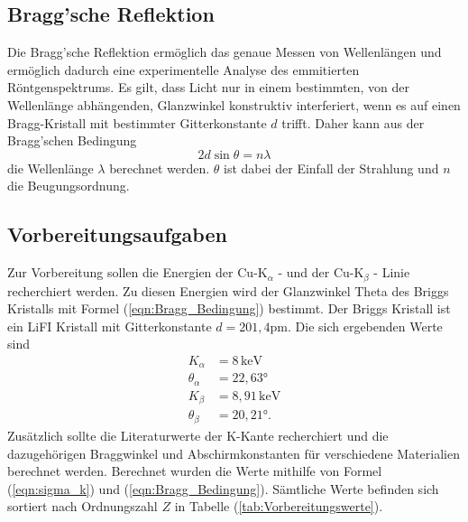 \subsection{Bragg'sche Reflektion}
Die Bragg'sche Reflektion ermöglich das genaue Messen von Wellenlängen und ermöglich dadurch eine experimentelle Analyse des emmitierten Röntgenspektrums. Es gilt, 
dass Licht nur in einem bestimmten, von der Wellenlänge abhängenden, Glanzwinkel konstruktiv interferiert, wenn es auf einen Bragg-Kristall mit bestimmter Gitterkonstante
$d$ trifft. Daher kann aus der Bragg'schen Bedingung 
\begin{equation}
    \label{eqn:Bragg_Bedingung}
    2 d \sin{\theta} = n \lambda
\end{equation}
die Wellenlänge $\lambda$ berechnet werden. $\theta$ ist dabei der Einfall der Strahlung und $n$ die Beugungsordnung.

\subsection{Vorbereitungsaufgaben}
\label{sec:Vorbereitungsaufgaben}
Zur Vorbereitung sollen die Energien der $\text{Cu-K}_\alpha$ - und der $\text{Cu-K}_{\beta}$ - Linie recherchiert werden. Zu diesen Energien wird der Glanzwinkel 
Theta des Briggs Kristalls mit Formel (\ref{eqn:Bragg_Bedingung}) bestimmt. Der Briggs Kristall ist ein LiFI Kristall mit Gitterkonstante $d = 201,4 \unit{\pico\meter}$.
Die sich ergebenden Werte sind 
\begin{align*}
    K_\alpha &= 8 \, \si{\kilo\electronvolt}\\
    \theta_\alpha &= 22,63 \unit{\degree} \\
    K_\beta &= 8,91 \, \si{\kilo\electronvolt}\\
    \theta_\beta &= 20,21 \unit{\degree} .
\end{align*}
Zusätzlich sollte die Literaturwerte der K-Kante recherchiert und die dazugehörigen Braggwinkel und Abschirmkonstanten für verschiedene Materialien berechnet werden.
Berechnet wurden die Werte mithilfe von Formel (\ref{eqn:sigma_k}) und (\ref{eqn:Bragg_Bedingung}).
Sämtliche Werte befinden sich sortiert nach Ordnungszahl $Z$ in Tabelle (\ref{tab:Vorbereitungswerte}).

